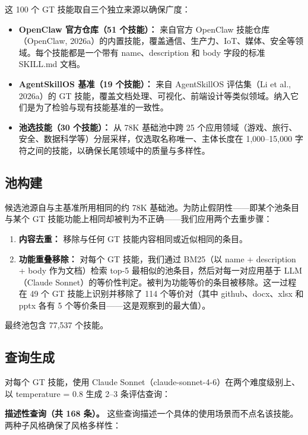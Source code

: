 \documentclass[11pt,UTF8,fontset=fandol]{ctexart}
\begin{document}
这 100 个 GT 技能取自三个独立来源以确保广度：

\begin{itemize}[leftmargin=2em]
\item \textbf{OpenClaw 官方仓库（51 个技能）：} 来自官方 OpenClaw 技能仓库（OpenClaw, 2026a）的内置技能，覆盖通信、生产力、IoT、媒体、安全等领域。每个技能都是一个带有 name、description 和 body 字段的标准 SKILL.md 文档。
\item \textbf{AgentSkillOS 基准（19 个技能）：} 来自 AgentSkillOS 评估集（Li et al., 2026a）的 GT 技能，覆盖文档处理、可视化、前端设计等类似领域。纳入它们是为了检验与现有技能基准的一致性。
\item \textbf{池选技能（30 个技能）：} 从 78K 基础池中跨 25 个应用领域（游戏、旅行、安全、数据科学等）分层采样，仅选取名称唯一、主体长度在 1,000--15,000 字符之间的技能，以确保长尾领域中的质量与多样性。
\end{itemize}

\subsection{池构建}

候选池源自与主基准所用相同的约 78K 基础池。为防止假阴性——即某个池条目与某个 GT 技能功能上相同却被判为不正确——我们应用两个去重步骤：

\begin{enumerate}[leftmargin=2em]
\item \textbf{内容去重：} 移除与任何 GT 技能内容相同或近似相同的条目。
\item \textbf{功能重叠移除：} 对每个 GT 技能，我们通过 BM25（以 name + description + body 作为文档）检索 top-5 最相似的池条目，然后对每一对应用基于 LLM（Claude Sonnet）的等价性判定。被判为功能等价的条目被移除。这一过程在 49 个 GT 技能上识别并移除了 114 个等价对（其中 github、docx、xlsx 和 pptx 各有 5 个等价条目——这是观察到的最大值）。
\end{enumerate}

最终池包含 77,537 个技能。

\subsection{查询生成}

对每个 GT 技能，使用 Claude Sonnet（claude-sonnet-4-6）在两个难度级别上、以 temperature = 0.8 生成 2--3 条评估查询：

\textbf{描述性查询（共 168 条）。} 这些查询描述一个具体的使用场景而不点名该技能。两种子风格确保了风格多样性：
\end{document}
